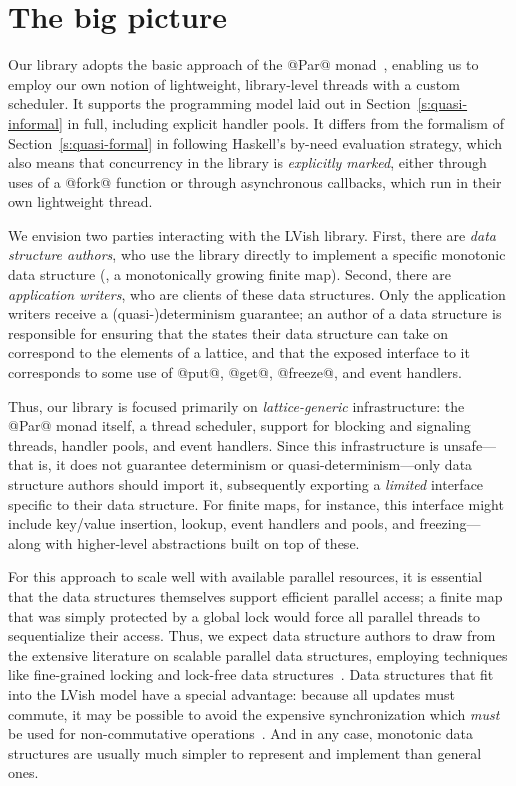 \section{The big picture}\label{s:lvish-big-picture}

Our library adopts the basic approach of the @Par@
monad~\cite{monad-par}, enabling us to employ our own notion of
lightweight, library-level threads with a custom scheduler.  It
supports the programming model laid out in
Section~\ref{s:quasi-informal} in full, including explicit handler
pools.  It differs from the formalism of Section~\ref{s:quasi-formal}
in following Haskell's by-need evaluation strategy, which also means
that concurrency in the library is \emph{explicitly marked}, either
through uses of a @fork@ function or through asynchronous callbacks,
which run in their own lightweight thread.

We envision two parties interacting with the LVish library.  First,
there are \emph{data structure authors}, who use the library directly
to implement a specific monotonic data structure (\eg, a monotonically
growing finite map).  Second, there are \emph{application writers},
who are clients of these data structures.  Only the application
writers receive a \mbox{(quasi-)determinism} guarantee; an author of a
data structure is responsible for ensuring that the states their data
structure can take on correspond to the elements of a lattice, and
that the exposed interface to it corresponds to some use of @put@,
@get@, @freeze@, and event handlers.

Thus, our library is focused primarily on \emph{lattice-generic}
infrastructure: the @Par@ monad itself, a thread scheduler, support
for blocking and signaling threads, handler pools, and event handlers.
Since this infrastructure is unsafe---that is, it does not guarantee
determinism or quasi-determinism---only data structure authors should
import it, subsequently exporting a \emph{limited} interface specific
to their data structure.  For finite maps, for instance, this
interface might include key/value insertion, lookup, event handlers
and pools, and freezing---along with higher-level abstractions built
on top of these.

For this approach to scale well with available parallel resources, it
is essential that the data structures themselves support efficient
parallel access; a finite map that was simply protected by a global
lock would force all parallel threads to sequentialize their access.
Thus, we expect data structure authors to draw from the extensive
literature on scalable parallel data structures, employing techniques
like fine-grained locking and lock-free data structures~\cite{art}.
Data structures that fit into the LVish model have a special
advantage: because all updates must commute, it may be possible to
avoid the expensive synchronization which \emph{must} be used for
non-commutative operations~\cite{lawsOfOrder}.  And in any case,
monotonic data structures are usually much simpler to represent and
implement than general ones. 
